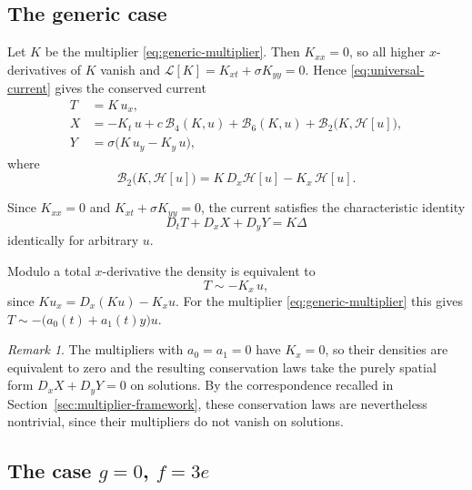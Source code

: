 \documentclass[11pt]{article}
\numberwithin{equation}{section}
\theoremstyle{definition}
\theoremstyle{remark}
\newtheorem{remark}[theorem]{Remark}
\begin{document}
\subsection{The generic case}

Let $K$ be the multiplier \eqref{eq:generic-multiplier}. Then
$K_{xx}=0$, so all higher $x$-derivatives of $K$ vanish and
$\mathcal{L}[K] = K_{xt}+\sigma K_{yy} = 0$. Hence
\eqref{eq:universal-current} gives the conserved current
\begin{equation}
\begin{aligned}
T &= K\,u_x,
\\
X &=
-K_t\,u
+c\,\mathcal{B}_4(K,u)
+\mathcal{B}_6(K,u)
+\mathcal{B}_2\bigl(K,\mathcal{H}[u]\bigr),
\\
Y &= \sigma\bigl(K\,u_y-K_y\,u\bigr),
\end{aligned}
\label{eq:generic-current}
\end{equation}
where
\[
\mathcal{B}_2\bigl(K,\mathcal{H}[u]\bigr)
=
K\,D_x\mathcal{H}[u]-K_x\,\mathcal{H}[u].
\]

Since $K_{xx}=0$ and
$K_{xt}+\sigma K_{yy}=0$, the current satisfies the characteristic
identity
\[
D_tT+D_xX+D_yY=K\Delta
\]
identically for arbitrary $u$.

Modulo a total $x$-derivative the density is equivalent to
\begin{equation}
T \sim -K_x\,u ,
\label{eq:generic-density-reduced}
\end{equation}
since $K u_x = D_x(K u) - K_x u$. For the multiplier
\eqref{eq:generic-multiplier} this gives
$T \sim -\bigl(a_0(t)+a_1(t)y\bigr)u$.

\begin{remark}
\label{rem:zero-density}
The multipliers with $a_0=a_1=0$ have $K_x=0$, so their densities are
equivalent to zero and the resulting conservation laws take the
purely spatial form $D_x X + D_y Y = 0$ on solutions. By the
correspondence recalled in Section~\ref{sec:multiplier-framework},
these conservation laws are nevertheless nontrivial, since their
multipliers do not vanish on solutions.
\end{remark}

\subsection{The case \texorpdfstring{$g=0$, $f=3e$}{g=0, f=3e}}
\end{document}
